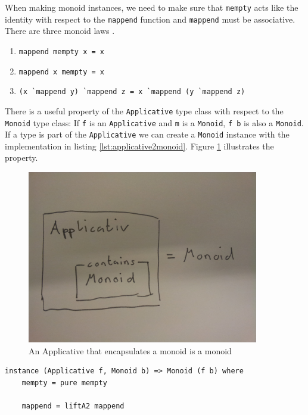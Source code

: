 When making monoid instances, we need to make sure that \verb|mempty| acts like the identity with respect to the \verb|mappend| function and \verb|mappend| must be associative. There are three monoid laws \cite{monoid}.

\begin{enumerate}
\item \verb|mappend mempty x = x|
\item \verb|mappend x mempty = x|
\item \verb|(x `mappend y) `mappend z = x `mappend (y `mappend z)|
\end{enumerate}

There is a useful property of the \verb|Applicative| type class with respect to the \verb|Monoid| type class: If \verb|f| is an \verb|Applicative| and \verb|m| is a \verb|Monoid|, \verb|f b| is also a \verb|Monoid|. If a type is part of the \verb|Applicative| we can create a \verb|Monoid| instance with the implementation in listing \ref{lst:applicative2monoid}. Figure \ref{fig:applicative_monoid} illustrates the property.

\begin{figure}
  \centering
     \includegraphics[width=0.9\textwidth]{applicative_monoid}
  \caption{An Applicative that encapsulates a monoid is a monoid}
  \label{fig:applicative_monoid}
\end{figure}

\begin{program}
\begin{verbatim}
instance (Applicative f, Monoid b) => Monoid (f b) where
    mempty = pure mempty

    mappend = liftA2 mappend
\end{verbatim}
\label{lst:applicative2monoid}
\caption{Applicative property}
\end{program}

